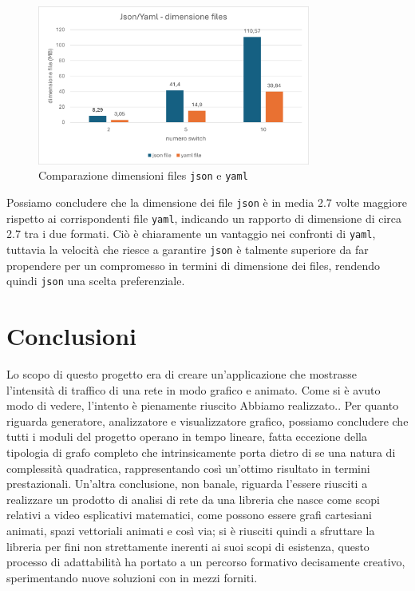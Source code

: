 \documentclass[binding=0.6cm]{sapthesis}
\begin{document}
\begin{figure}[h]
    \centering
    \includegraphics[width=0.8\textwidth]{immagini/json_yaml_files_dim.png}
    \caption{Comparazione dimensioni files \texttt{json} e \texttt{yaml}}
    \label{fig:json_yaml_files_dim}
\end{figure}

Possiamo concludere che la dimensione dei file \texttt{json} è in media 2.7 volte maggiore rispetto ai corrispondenti file \texttt{yaml}, 
indicando un rapporto di dimensione di circa 2.7 tra i due formati. Ciò è chiaramente un vantaggio nei confronti di \texttt{yaml}, tuttavia la velocità che riesce a garantire \texttt{json} è talmente 
superiore da far propendere per un compromesso in termini di dimensione dei files, rendendo quindi \texttt{json} una scelta preferenziale.

\chapter{Conclusioni}

Lo scopo di questo progetto era di creare un'applicazione che mostrasse l'intensità di traffico di una rete in modo grafico e animato. Come si è avuto modo di vedere,
l'intento è pienamente riuscito
Abbiamo realizzato..
Per quanto riguarda generatore, analizzatore e visualizzatore grafico, possiamo concludere che tutti i moduli del progetto
 operano in tempo lineare, fatta eccezione della tipologia di grafo completo che intrinsicamente porta dietro di se una natura di complessità quadratica,
rappresentando così un'ottimo risultato in termini prestazionali.
Un'altra conclusione, non banale, riguarda l'essere riusciti a realizzare un prodotto di analisi di rete da una libreria
 che nasce come scopi relativi a video esplicativi matematici, come possono essere grafi cartesiani animati, spazi vettoriali animati e così via;
si è riusciti quindi a sfruttare la libreria per fini non strettamente inerenti ai suoi scopi di esistenza, 
questo processo di adattabilità ha portato a un percorso formativo decisamente creativo, sperimentando nuove soluzioni con in mezzi forniti.
\end{document}
